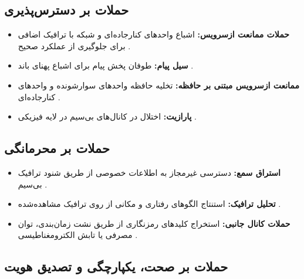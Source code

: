 \documentclass[12pt,a4paper]{article}
\begin{document}
\subsection{حملات بر دسترس‌پذیری}

\begin{itemize}
  \item \textbf{حملات ممانعت ازسرویس:} اشباع واحدهای کنارجاده‌ای و شبکه با ترافیک اضافی برای جلوگیری از عملکرد صحیح \cite{farsimadanReviewSecurityChallenges2025}.
  \item \textbf{سیل پیام:} طوفان پخش پیام برای اشباع پهنای باند \cite{VanetSecurityPrivacy}.
  \item \textbf{ممانعت ازسرویس مبتنی بر حافظه:} تخلیه حافظه واحدهای سوارشونده و واحدهای کنارجاده‌ای \cite{rahmawatiagustinaSystematicLiteratureReview2025}.
  \item \textbf{پارازیت:} اختلال در کانال‌های بی‌سیم در لایه فیزیکی \cite{farsimadanReviewSecurityChallenges2025}.
\end{itemize}

\subsection{حملات بر محرمانگی}

\begin{itemize}
  \item \textbf{استراق سمع:} دسترسی غیرمجاز به اطلاعات خصوصی از طریق شنود ترافیک بی‌سیم \cite{farsimadanReviewSecurityChallenges2025}.
  \item \textbf{تحلیل ترافیک:} استنتاج الگوهای رفتاری و مکانی از روی ترافیک مشاهده‌شده \cite{farsimadanReviewSecurityChallenges2025}.
  \item \textbf{حملات کانال جانبی:} استخراج کلیدهای رمزنگاری از طریق نشت زمان‌بندی، توان مصرفی یا تابش الکترومغناطیسی \cite{rahmawatiagustinaSystematicLiteratureReview2025}.
\end{itemize}

\subsection{حملات بر صحت، یکپارچگی و تصدیق هویت}
\end{document}

